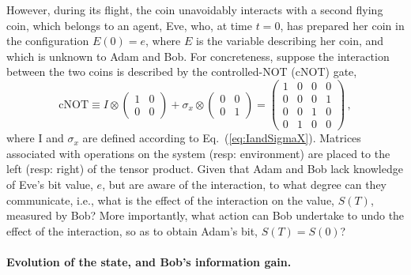 However, during its flight, the coin unavoidably interacts with a
second flying coin, which belongs to an agent, Eve, who, at time $t=0$,
has prepared her coin in the configuration $E\left(0\right)=e$, where
$E$ is the variable describing her coin, and which is unknown to
Adam and Bob. For concreteness, suppose the interaction between the
two coins is described by the controlled-NOT (cNOT) gate, 
\begin{equation}
\mathrm{cNOT}\equiv I\otimes\begin{pmatrix}1 & 0\\
0 & 0
\end{pmatrix}+\sigma_{x}\otimes\begin{pmatrix}0 & 0\\
0 & 1
\end{pmatrix}=\begin{pmatrix}1 & 0 & 0 & 0\\
0 & 0 & 0 & 1\\
0 & 0 & 1 & 0\\
0 & 1 & 0 & 0
\end{pmatrix}\,,\label{eq:cNOT}
\end{equation}
where I and $\sigma_{x}$ are defined according to Eq.~(\ref{eq:IandSigmaX}).
Matrices associated with operations on the system (resp: environment)
are placed to the left (resp: right) of the tensor product. Given
that Adam and Bob lack knowledge of Eve's bit value, $e$, but are
aware of the interaction, to what degree can they communicate, i.e.,
what is the effect of the interaction on the value, $S\left(T\right)$,
measured by Bob?  More importantly, what action can Bob undertake
to undo the effect of the interaction, so as to obtain Adam's bit,
$S\left(T\right)=S\left(0\right)$? 

\paragraph{Evolution of the state, and Bob's information gain. }

